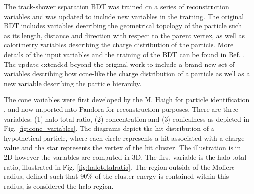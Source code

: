 The track-shower separation BDT was trained on a series of reconstruction variables and was updated to include new variables in the training.
The original BDT includes variables describing the geometrical topology of the particle such as its length, distance and direction with respect to the parent vertex, as well as calorimetry variables describing the charge distribution of the particle.
More details of the input variables and the training of the BDT can be found in Ref. \cite{EdPhD}.
The update extended beyond the original work to include a brand new set of variables describing how cone-like the charge distribution of a particle as well as a new variable describing the particle hierarchy.

The cone variables were first developed by the M. Haigh for particle identification \cite{warwick_pid}, and now imported into Pandora for reconstruction purposes.
There are three variables: (1) halo-total ratio, (2) concentration and (3) conicalness as depicted in Fig. \ref{fig:cone_variables}.
The diagrams depict the hit distribution of a hypothetical particle, where each circle represents a hit associated with a charge value and the star represents the vertex of the hit cluster.
The illustration is in 2D however the variables are computed in 3D.
The first variable is the halo-total ratio, illustrated in Fig. \ref{fig:halototalratio}.
The region outside of the Moliere radius, defined such that 90\% of the cluster energy is contained within this radius, is considered the halo region.
